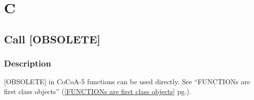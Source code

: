 \documentclass[a4paper]{mybook}
\newenvironment{command}{}{} %
\begin{document}
\chapter{C}  %
\label{C}

\section{Call [OBSOLETE]}
\label{Call [OBSOLETE]}
\begin{command} %



\subsection*{Description}

[OBSOLETE] in CoCoA-5 functions can be used directly.
See ``FUNCTIONs are first class objects'' (\ref{FUNCTIONs are first class objects} pg.\pageref{FUNCTIONs are first class objects}).

\end{command} %
\end{document}
